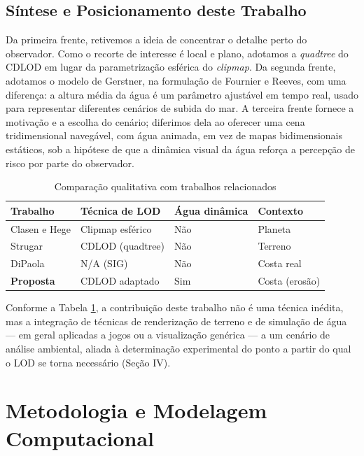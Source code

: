 \documentclass[conference]{IEEEtran}
\begin{document}
\subsection{Síntese e Posicionamento deste Trabalho}

Da primeira frente, retivemos a ideia de concentrar o detalhe perto do
observador. Como o recorte de interesse é local e plano, adotamos a
\emph{quadtree} do CDLOD em lugar da parametrização esférica do
\emph{clipmap}. Da segunda frente, adotamos o modelo de Gerstner, na
formulação de Fournier e Reeves, com uma diferença: a altura média da
água é um parâmetro ajustável em tempo real, usado para representar
diferentes cenários de subida do mar. A terceira frente fornece a
motivação e a escolha do cenário; diferimos dela ao oferecer uma cena
tridimensional navegável, com água animada, em vez de mapas
bidimensionais estáticos, sob a hipótese de que a dinâmica visual da
água reforça a percepção de risco por parte do observador.

\begin{table}[t]
\caption{Comparação qualitativa com trabalhos relacionados}
\label{tab:comparacao}
\centering
\begin{tabular}{@{}p{2.0cm}p{2.2cm}p{1.7cm}p{1.6cm}@{}}
\toprule
\textbf{Trabalho} & \textbf{Técnica de LOD} & \textbf{Água dinâmica} & \textbf{Contexto} \\
\midrule
Clasen e Hege \cite{clasenhege2006} & Clipmap esférico & Não & Planeta \\
Strugar \cite{strugar2009} & CDLOD (quadtree) & Não & Terreno \\
DiPaola \cite{dipaola2023} & N/A (SIG) & Não & Costa real \\
\textbf{Proposta} & CDLOD adaptado & Sim & Costa (erosão) \\
\bottomrule
\end{tabular}
\end{table}

Conforme a Tabela \ref{tab:comparacao}, a contribuição deste trabalho
não é uma técnica inédita, mas a integração de técnicas de renderização
de terreno e de simulação de água --- em geral aplicadas a jogos ou a
visualização genérica --- a um cenário de análise ambiental, aliada à
determinação experimental do ponto a partir do qual o LOD se torna
necessário (Seção IV).

\section{Metodologia e Modelagem Computacional}
\end{document}
